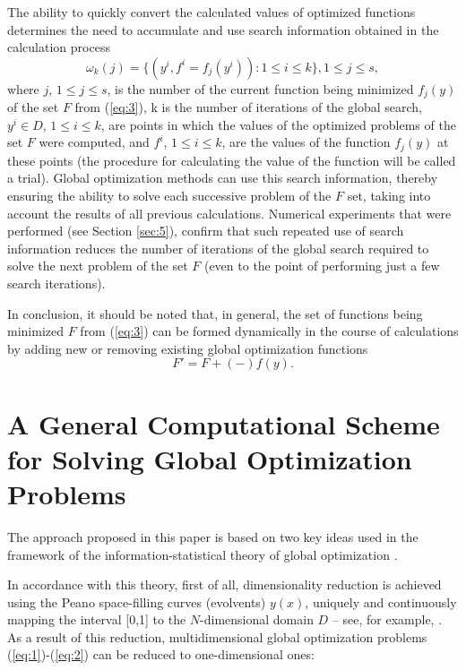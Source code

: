 \documentclass[review]{elsarticle}
\begin{document}
The ability to quickly convert the calculated values of optimized functions determines the need to accumulate and use search information obtained in the calculation process
\begin{equation}\label{eq:9}
\omega_k (j)=\{(y^i,f^i=f_j(y^i)):1 \leq i \leq k \},1 \leq j \leq s,
\end{equation}
where $j$, $1 \leq j \leq s$, is the number of the current function being minimized $f_j (y)$ of the set $F$ from (\ref{eq:3}), k is the number of iterations of the global search, $y^i \in D$, $1 \leq i \leq k$,  are points in which the values of the optimized problems of the set $F$ were computed, and $f^i$, $1 \leq i \leq k$, are the values of the function $f_j (y)$ at these points (the procedure for calculating the value of the function will be called a trial). Global optimization methods can use this search information, thereby ensuring the ability to solve each successive problem of the $F$ set, taking into account the results of all previous calculations. Numerical experiments that were performed (see Section \ref{sec:5}), confirm that such repeated use of search information reduces the number of iterations of the global search required to solve the next problem of the set $F$ (even to the point of performing just a few search iterations).

In conclusion, it should be noted that, in general, the set of functions being minimized $F$ from (\ref{eq:3}) can be formed dynamically in the course of calculations by adding new or removing existing global optimization functions
\begin{equation}\label{eq:10}
F'=F+(-) f(y).
\end{equation}


\section{A General Computational Scheme for Solving Global Optimization Problems}\label{sec:3}

The approach proposed in this paper is based on two key ideas used in the framework of the information-statistical theory of global optimization \cite{c6}.

In accordance with this theory, first of all, dimensionality reduction is achieved using the Peano space-filling curves (evolvents) $y(x)$, uniquely and continuously mapping the interval [0,1] to the $N$-dimensional domain $D$ -- see, for example, \cite{c6,c23}. As a result of this reduction, multidimensional global optimization problems (\ref{eq:1})-(\ref{eq:2}) can be reduced to one-dimensional ones:
\end{document}
